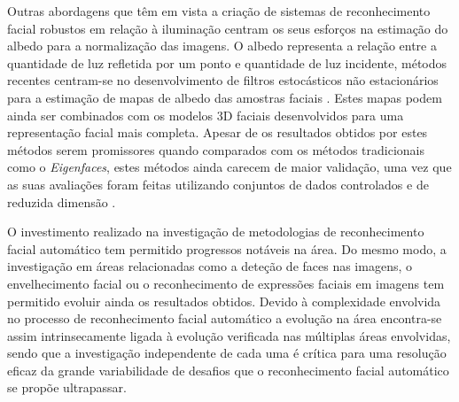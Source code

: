  Outras abordagens que têm em vista a criação de sistemas de reconhecimento facial robustos em relação à iluminação centram os seus esforços na estimação do albedo para a normalização das imagens. O albedo representa a relação entre a quantidade de luz refletida por um ponto e quantidade de luz incidente, métodos recentes centram-se no desenvolvimento de filtros estocásticos não estacionários para a estimação de mapas de albedo das amostras faciais \cite{Biswas2009}. Estes mapas podem ainda ser combinados com os modelos 3D faciais desenvolvidos para uma representação facial mais completa. Apesar de os resultados obtidos por estes métodos serem promissores quando comparados com os métodos tradicionais como o \textit{Eigenfaces}, estes métodos ainda carecem de maior validação, uma vez que as suas avaliações foram feitas utilizando conjuntos de dados controlados e de reduzida dimensão \citep{Chellappa2010}.
 
O investimento realizado na investigação de metodologias de reconhecimento facial automático tem permitido progressos notáveis na área. Do mesmo modo, a investigação em áreas relacionadas como a deteção de faces nas imagens, o envelhecimento facial ou o reconhecimento de expressões faciais em imagens tem permitido evoluir ainda os resultados obtidos. Devido à complexidade envolvida no processo de reconhecimento facial automático a evolução na área encontra-se assim intrinsecamente ligada à evolução verificada nas múltiplas áreas envolvidas, sendo que a investigação independente de cada uma é crítica para uma resolução eficaz da grande variabilidade de desafios que o reconhecimento facial automático se propõe ultrapassar.

